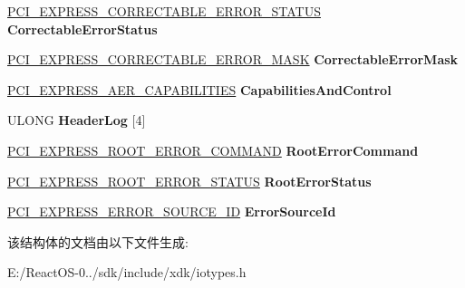 \begin{DoxyCompactItemize}
\hyperlink{union___p_c_i___e_x_p_r_e_s_s___c_o_r_r_e_c_t_a_b_l_e___e_r_r_o_r___s_t_a_t_u_s}{P\+C\+I\+\_\+\+E\+X\+P\+R\+E\+S\+S\+\_\+\+C\+O\+R\+R\+E\+C\+T\+A\+B\+L\+E\+\_\+\+E\+R\+R\+O\+R\+\_\+\+S\+T\+A\+T\+US} {\bfseries Correctable\+Error\+Status}
\item 
\mbox{\label{struct___p_c_i___e_x_p_r_e_s_s___r_o_o_t_p_o_r_t___a_e_r___c_a_p_a_b_i_l_i_t_y_a3149399cf1976e6f1d92862c362bfa62}} 
\hyperlink{union___p_c_i___e_x_p_r_e_s_s___c_o_r_r_e_c_t_a_b_l_e___e_r_r_o_r___m_a_s_k}{P\+C\+I\+\_\+\+E\+X\+P\+R\+E\+S\+S\+\_\+\+C\+O\+R\+R\+E\+C\+T\+A\+B\+L\+E\+\_\+\+E\+R\+R\+O\+R\+\_\+\+M\+A\+SK} {\bfseries Correctable\+Error\+Mask}
\item 
\mbox{\label{struct___p_c_i___e_x_p_r_e_s_s___r_o_o_t_p_o_r_t___a_e_r___c_a_p_a_b_i_l_i_t_y_afecae795eadffe1b2e5597a5d9cad982}} 
\hyperlink{union___p_c_i___e_x_p_r_e_s_s___a_e_r___c_a_p_a_b_i_l_i_t_i_e_s}{P\+C\+I\+\_\+\+E\+X\+P\+R\+E\+S\+S\+\_\+\+A\+E\+R\+\_\+\+C\+A\+P\+A\+B\+I\+L\+I\+T\+I\+ES} {\bfseries Capabilities\+And\+Control}
\item 
\mbox{\label{struct___p_c_i___e_x_p_r_e_s_s___r_o_o_t_p_o_r_t___a_e_r___c_a_p_a_b_i_l_i_t_y_afc73830b0e740e5fb627f533777c9121}} 
U\+L\+O\+NG {\bfseries Header\+Log} \mbox{[}4\mbox{]}
\item 
\mbox{\label{struct___p_c_i___e_x_p_r_e_s_s___r_o_o_t_p_o_r_t___a_e_r___c_a_p_a_b_i_l_i_t_y_ad4d20e87b4bd58dbd76f4d2fd64591c0}} 
\hyperlink{union___p_c_i___e_x_p_r_e_s_s___r_o_o_t___e_r_r_o_r___c_o_m_m_a_n_d}{P\+C\+I\+\_\+\+E\+X\+P\+R\+E\+S\+S\+\_\+\+R\+O\+O\+T\+\_\+\+E\+R\+R\+O\+R\+\_\+\+C\+O\+M\+M\+A\+ND} {\bfseries Root\+Error\+Command}
\item 
\mbox{\label{struct___p_c_i___e_x_p_r_e_s_s___r_o_o_t_p_o_r_t___a_e_r___c_a_p_a_b_i_l_i_t_y_a020ebd5381b0d1a88ace9e029b790cad}} 
\hyperlink{union___p_c_i___e_x_p_r_e_s_s___r_o_o_t___e_r_r_o_r___s_t_a_t_u_s}{P\+C\+I\+\_\+\+E\+X\+P\+R\+E\+S\+S\+\_\+\+R\+O\+O\+T\+\_\+\+E\+R\+R\+O\+R\+\_\+\+S\+T\+A\+T\+US} {\bfseries Root\+Error\+Status}
\item 
\mbox{\label{struct___p_c_i___e_x_p_r_e_s_s___r_o_o_t_p_o_r_t___a_e_r___c_a_p_a_b_i_l_i_t_y_abec249cce3813867210587be767611eb}} 
\hyperlink{union___p_c_i___e_x_p_r_e_s_s___e_r_r_o_r___s_o_u_r_c_e___i_d}{P\+C\+I\+\_\+\+E\+X\+P\+R\+E\+S\+S\+\_\+\+E\+R\+R\+O\+R\+\_\+\+S\+O\+U\+R\+C\+E\+\_\+\+ID} {\bfseries Error\+Source\+Id}
\end{DoxyCompactItemize}


该结构体的文档由以下文件生成\+:\begin{DoxyCompactItemize}
\item 
E\+:/\+React\+O\+S-\/0../sdk/include/xdk/iotypes.\+h\end{DoxyCompactItemize}
